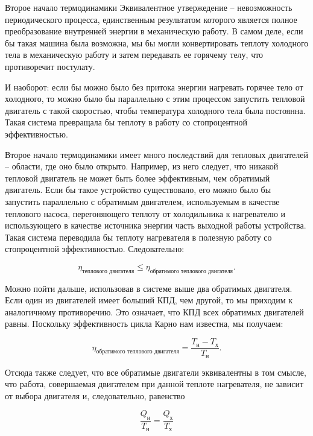 \documentclass{article}
\begin{document}
\begin{section}{Второе начало термодинамики}
		Эквивалентное утвержедение -- невозможность периодического процесса, единственным результатом которого является полное преобразование внутренней энергии в механическую работу. В самом деле, если бы такая машина была возможна, мы бы могли конвертировать теплоту холодного тела в механическую работу и затем передавать ее горячему телу, что противоречит постулату.

		И наоборот: если бы можно было без притока энергии нагревать горячее тело от холодного, то можно было бы параллельно с этим процессом запустить тепловой двигатель с такой скоростью, чтобы температура холодного тела была постоянна. Такая система превращала бы теплоту в работу со стопроцентной эффективностью.

		Второе начало термодинамики имеет много последствий для тепловых двигателей -- области, где оно было открыто. Например, из него следует, что никакой тепловой двигатель не может быть более эффективным, чем обратимый двигатель. Если бы такое устройство существовало, его можно было бы запустить параллельно с обратимым двигателем, используемым в качестве теплового насоса, перегоняющего теплоту от холодильника к нагревателю и использующего в качестве источника энергии часть выходной работы устройства. Такая система переводила бы теплоту нагревателя в полезную работу со стопроцентной эффективностью. Следовательно:

		\begin{equation*}
			\eta_{\text{теплового двигателя}} \le \eta_{\text{обратимого теплового двигателя}}.
		\end{equation*}

		Можно пойти дальше, использовав в системе выше два обратимых двигателя. Если один из двигателей имеет больший КПД, чем другой, то мы приходим к аналогичному противоречию. Это означает, что КПД всех обратимых двигателей равны. Поскольку эффективность цикла Карно нам известна, мы получаем:

		\begin{equation*}
			\eta_{\text{обратимого теплового двигателя}} = \frac{T_{\text{н}} - T_{\text{х}}}{T_{\text{н}}}.
		\end{equation*}

		Отсюда также следует, что все обратимые двигатели эквивалентны в том смысле, что работа, совершаемая двигателем при данной теплоте нагревателя, не зависит от выбора двигателя и, следовательно, равенство

		\begin{equation*}
			\frac{Q_{\text{н}}}{T_{\text{н}}} = \frac{Q_{\text{х}}}{T_{\text{х}}}
		\end{equation*}


\end{section}
\end{document}
